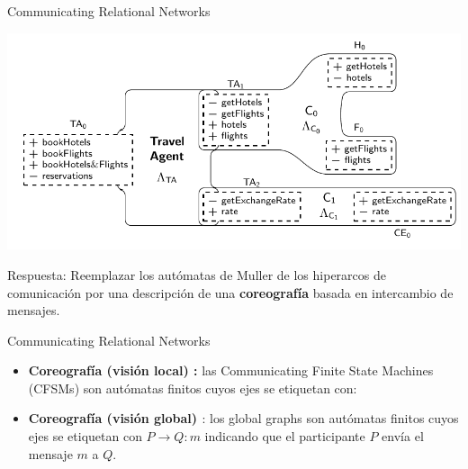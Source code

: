 \documentclass[10pt,xcolor={table,dvipsnames},t]{beamer}
\begin{document}
\begin{frame}{Communicating Relational Networks\cite{vissani:places15}}
\begin{center}
    \includegraphics[scale=0.5]{images/ARN0.png}
\end{center}
Respuesta: Reemplazar los autómatas de Muller de los hiperarcos de comunicación por una descripción de una \textbf{coreografía} basada en intercambio de mensajes.
\end{frame}


\begin{frame}{Communicating Relational Networks}
\begin{itemize}
    \item \textbf{Coreografía (visión local) \cite{brand:jacm-30_2}:} las Communicating Finite State Machines (CFSMs)  son autómatas finitos cuyos ejes se etiquetan con:  
    \item \textbf{Coreografía (visión global) \cite{denielou:esop12}}: los global graphs son autómatas finitos cuyos ejes se etiquetan con $P \rightarrow Q:m$ indicando que el participante $P$ envía el mensaje $m$ a $Q$.
\end{itemize}
\end{frame}
\end{document}
